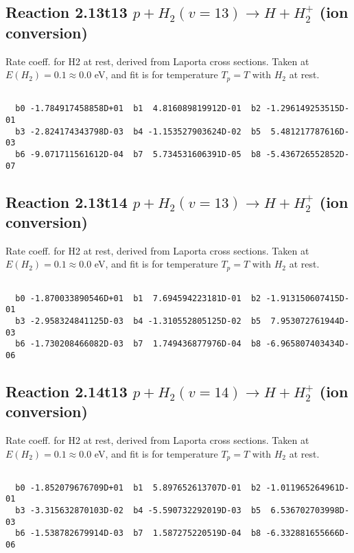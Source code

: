 \documentclass[12pt,dvipdfmx]{article}
\begin{document}
\newpage
\subsection{
Reaction 2.13t13
$ p + H_2(v=13) \rightarrow H + H_2^+$ (ion conversion)
}
Rate coeff. for H2 at rest, derived from Laporta cross sections.
Taken at $E(H_2) = 0.1 \approx 0.0$ eV,  and fit is for temperature $T_p=T$ with $H_2$ at rest.

\begin{small}\begin{verbatim}

  b0 -1.784917458858D+01  b1  4.816089819912D-01  b2 -1.296149253515D-01
  b3 -2.824174343798D-03  b4 -1.153527903624D-02  b5  5.481217787616D-03
  b6 -9.071711561612D-04  b7  5.734531606391D-05  b8 -5.436726552852D-07

\end{verbatim}\end{small}

\newpage
\subsection{
Reaction 2.13t14
$ p + H_2(v=13) \rightarrow H + H_2^+$ (ion conversion)
}
Rate coeff. for H2 at rest, derived from Laporta cross sections.
Taken at $E(H_2) = 0.1 \approx 0.0$ eV,  and fit is for temperature $T_p=T$ with $H_2$ at rest.

\begin{small}\begin{verbatim}

  b0 -1.870033890546D+01  b1  7.694594223181D-01  b2 -1.913150607415D-01
  b3 -2.958324841125D-03  b4 -1.310552805125D-02  b5  7.953072761944D-03
  b6 -1.730208466082D-03  b7  1.749436877976D-04  b8 -6.965807403434D-06

\end{verbatim}\end{small}

\newpage
\subsection{
Reaction 2.14t13
$ p + H_2(v=14) \rightarrow H + H_2^+$ (ion conversion)
}
Rate coeff. for H2 at rest, derived from Laporta cross sections.
Taken at $E(H_2) = 0.1 \approx 0.0$ eV,  and fit is for temperature $T_p=T$ with $H_2$ at rest.

\begin{small}\begin{verbatim}

  b0 -1.852079676709D+01  b1  5.897652613707D-01  b2 -1.011965264961D-01
  b3 -3.315632870103D-02  b4 -5.590732292019D-03  b5  6.536702703998D-03
  b6 -1.538782679914D-03  b7  1.587275220519D-04  b8 -6.332881655666D-06

\end{verbatim}\end{small}
\end{document}
